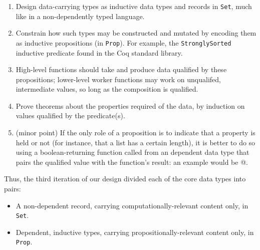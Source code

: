 \documentclass{llncs}
\newif\ifdraft\drafttrue  %
\newenvironment{MyCoqExampleStar}{\small \verbatim}{\endverbatim \normalsize}
\newcommand{\xcomment}[3]{\ifdraft\textcolor{#1}{[#2: #3]}\else\fi}
\newcommand{\gts}[1]{\xcomment{OliveGreen}{GTS}{#1}}
\begin{document}
\begin{enumerate}
\item Design data-carrying types as inductive data types and records in
  \texttt{Set}, much like in a non-dependently typed language.

\item Constrain how such types may be constructed and mutated by encoding them
  as inductive propositions (in \texttt{Prop}).  For example, the
  \texttt{StronglySorted} inductive predicate found in the Coq standard
  library.

\item High-level functions should take and produce data qualified by these
  propositions; lower-level worker functions may work on unqualifed,
  intermediate values, so long as the composition is qualified.

\item Prove theorems about the properties required of the data, by induction
  on values qualified by the predicate(s).

\item (minor point) If the only role of a proposition is to indicate
  that a property is held or not (for instance, that a list has a
  certain length), it is better to do so using a boolean-returning
  function called from an dependent data type 
that pairs the
  qualified value with the function's result: an example would be
  @.


  

\end{enumerate}

Thus, the third iteration of our design divided each of the core data types
into pairs:

\begin{itemize}
\item A non-dependent record, carrying computationally-relevant content only,
  in \texttt{Set}.

\item Dependent, inductive types, carrying propositionally-relevant content
  only, in \texttt{Prop}.
\end{itemize}
\end{document}
